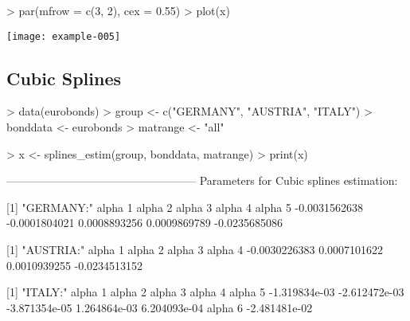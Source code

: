 \begin{center}
\begin{Schunk}
\begin{Sinput}
> par(mfrow = c(3, 2), cex = 0.55)
> plot(x)
\end{Sinput}
\end{Schunk}
\texttt{[image: example-005]}
\end{center}

\subsection{Cubic Splines}

\begin{Schunk}
\begin{Sinput}
> data(eurobonds)
> group <- c("GERMANY", "AUSTRIA", "ITALY")
> bonddata <- eurobonds
> matrange <- "all"
\end{Sinput}
\end{Schunk}

\begin{Schunk}
\begin{Sinput}
> x <- splines_estim(group, bonddata, matrange)
> print(x)
\end{Sinput}
\begin{Soutput}
---------------------------------------------------
Parameters for Cubic splines estimation:

[1] "GERMANY:"
      alpha 1       alpha 2       alpha 3       alpha 4       alpha 5 
-0.0031562638 -0.0001804021  0.0008893256  0.0009869789 -0.0235685086 

[1] "AUSTRIA:"
      alpha 1       alpha 2       alpha 3       alpha 4 
-0.0030226383  0.0007101622  0.0010939255 -0.0234513152 

[1] "ITALY:"
      alpha 1       alpha 2       alpha 3       alpha 4       alpha 5 
-1.319834e-03 -2.612472e-03 -3.871354e-05  1.264864e-03  6.204093e-04 
      alpha 6 
-2.481481e-02 
\end{Soutput}
\end{Schunk}


